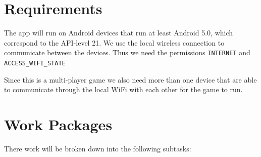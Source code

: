 \documentclass{sig-alternate}
\begin{document}
\section{Requirements}
The app will run on Android devices that run at least Android 5.0, which correspond to the API-level 21. We use the local wireless connection to communicate between the devices. Thus we need the permissions \verb|INTERNET| and \verb|ACCESS_WIFI_STATE|

Since this is a multi-player game we also need more than one device that are able to communicate through the local WiFi with each other for the game to run.

\section{Work Packages}
There work will be broken down into the following subtasks:
\end{document}
